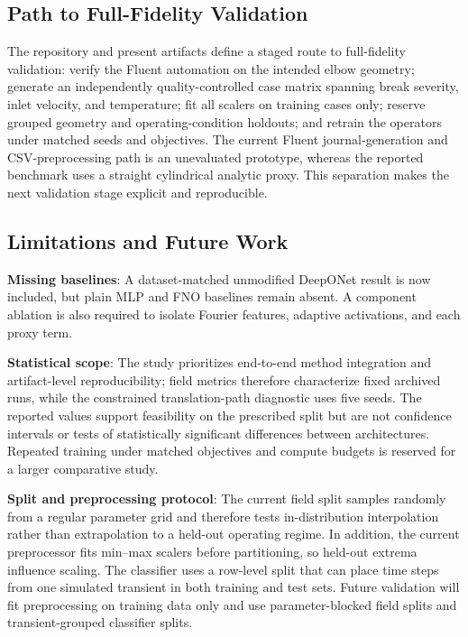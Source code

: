 \documentclass[journal]{IEEEtran}
\newcommand{\added}[1]{#1}
\begin{document}
\subsection{Path to Full-Fidelity Validation}

\added{The repository and present artifacts define a staged route to full-fidelity validation: verify the Fluent automation on the intended elbow geometry; generate an independently quality-controlled case matrix spanning break severity, inlet velocity, and temperature; fit all scalers on training cases only; reserve grouped geometry and operating-condition holdouts; and retrain the operators under matched seeds and objectives. The current Fluent journal-generation and CSV-preprocessing path is an unevaluated prototype, whereas the reported benchmark uses a straight cylindrical analytic proxy. This separation makes the next validation stage explicit and reproducible.}

\subsection{Limitations and Future Work}
\label{sec:limitations}

\textbf{Missing baselines}:  \added{A dataset-matched unmodified DeepONet result is now included, but plain MLP and FNO baselines remain absent. A component ablation is also required to isolate Fourier features, adaptive activations, and each proxy term.}

\added{\textbf{Statistical scope}: The study prioritizes end-to-end method integration and artifact-level reproducibility; field metrics therefore characterize fixed archived runs, while the constrained translation-path diagnostic uses five seeds. The reported values support feasibility on the prescribed split but are not confidence intervals or tests of statistically significant differences between architectures. Repeated training under matched objectives and compute budgets is reserved for a larger comparative study.}

\textbf{Split and preprocessing protocol}: \added{The current field split samples randomly from a regular parameter grid and therefore tests in-distribution interpolation rather than extrapolation to a held-out operating regime. In addition, the current preprocessor fits min--max scalers before partitioning, so held-out extrema influence scaling. The classifier uses a row-level split that can place time steps from one simulated transient in both training and test sets. Future validation will fit preprocessing on training data only and use parameter-blocked field splits and transient-grouped classifier splits.}
\end{document}
